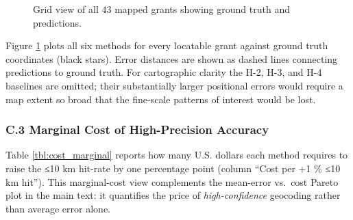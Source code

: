\documentclass[
  10pt]{article}
\begin{document}
\begin{figure}
\centering
\caption{Grid view of all 43 mapped grants showing ground truth and
predictions.}\label{fig:contactsheet}
\end{figure}

Figure \ref{fig:contactsheet} plots all six methods for every locatable
grant against ground truth coordinates (black stars). Error distances
are shown as dashed lines connecting predictions to ground truth. For
cartographic clarity the H-2, H-3, and H-4 baselines are omitted; their
substantially larger positional errors would require a map extent so
broad that the fine-scale patterns of interest would be lost.

\subsubsection{C.3 Marginal Cost of High-Precision
Accuracy}\label{c.3-marginal-cost-of-high-precision-accuracy}

Table \ref{tbl:cost_marginal} reports how many U.S. dollars each method
requires to raise the ≤10 km hit-rate by one percentage point (column
``Cost per +1 \% ≤10 km hit''). This marginal-cost view complements the
mean-error vs.~cost Pareto plot in the main text: it quantifies the
price of \emph{high-confidence} geocoding rather than average error
alone.
\end{document}
